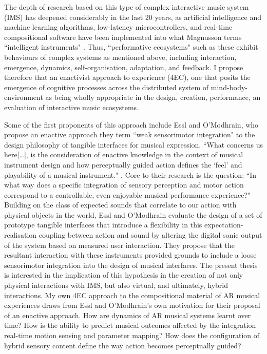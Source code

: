 The depth of research based on this type of complex interactive music system (IMS) has deepened considerably in the last 20 years, as artificial intelligence and machine learning algorithms, low-latency microcontrollers, and real-time compositional software have been implemented into what Magnusson terms ``intelligent instruments" \citeyearpar[p. 8]{magnusson2009}. Thus, ``performative ecosystems" \citep[]{waters2007} such as these exhibit behaviours of complex systems as mentioned above, including interaction, emergence, dynamics, self-organisation, adaptation, and feedback. I propose therefore that an enactivist approach to experience (4EC), one that posits the emergence of cognitive processes across the distributed system of mind-body-environment as being wholly appropriate in the design, creation, performance, an evaluation of interactive music ecosystems. 

Some of the first proponents of this approach include Essl and O'Modhrain, who propose an enactive approach they term ``weak sensorimotor integration" to the design philosophy of tangible interfaces for musical expression. ``What concerns us here[…], is the consideration of enactive knowledge in the context of musical instrument design and how perceptually guided action defines the `feel' and playability of a musical instrument." \citeyearpar[p. 3]{essl2006}. Core to their research is the question: ``In what way does a specific integration of sensory perception and motor action correspond to a controllable, even enjoyable musical performance experience?" Building on the class of expected sounds that correlate to our action with physical objects in the world, Essl and O'Modhrain evaluate the design of a set of prototype tangible interfaces that introduce a flexibility in this expectation-realisation coupling between action and sound by altering the digital sonic output of the system based on measured user interaction. They propose that the resultant interaction with these instruments provided grounds to include a loose sensorimotor integration into the design of musical interfaces. The present thesis is interested in the implication of this hypothesis in the creation of not only physical interactions with IMS, but also virtual, and ultimately, hybrid interactions. My own 4EC approach to the compositional material of AR musical experiences draws from Essl and O'Modhrain's own motivation for their proposal of an enactive approach. How are dynamics of AR musical systems learnt over time? How is the ability to predict musical outcomes affected by the integration real-time motion sensing and parameter mapping? How does the configuration of hybrid sensory content define the way action becomes perceptually guided?

